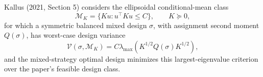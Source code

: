 Kallus (2021, Section 5) considers the ellipsoidal conditional-mean class
\[
\mathcal M_K=\{Ku:u^\top Ku\leq C\},
\qquad K\succeq0,
\]
for which a symmetric balanced mixed design \(\sigma\), with assignment second moment \(Q(\sigma)\), has worst-case design variance
\[
\mathcal V(\sigma,\mathcal M_K)
=C\lambda_{\max}\!\left(K^{1/2}Q(\sigma)K^{1/2}\right),
\]
and the mixed-strategy optimal design minimizes this largest-eigenvalue criterion over the paper's feasible design class.